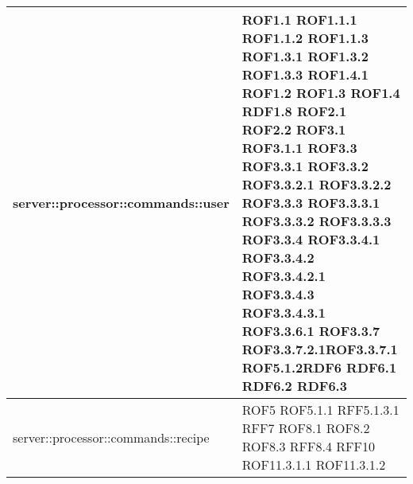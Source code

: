 \begin{center}
\begin{longtable}{| p{9cm} | p{4cm} |}
server::processor::commands::user  &  ROF1.1 \newline ROF1.1.1 \newline ROF1.1.2 \newline ROF1.1.3 \newline ROF1.3.1 \newline ROF1.3.2 \newline ROF1.3.3 \newline ROF1.4.1 \newline ROF1.2 \newline ROF1.3 \newline ROF1.4 \newline RDF1.8 \newline ROF2.1 \newline ROF2.2 \newline ROF3.1 \newline ROF3.1.1  \newline ROF3.3 \newline ROF3.3.1 \newline ROF3.3.2 \newline ROF3.3.2.1 \newline ROF3.3.2.2 \newline ROF3.3.3 \newline ROF3.3.3.1 \newline ROF3.3.3.2 \newline ROF3.3.3.3 \newline ROF3.3.4 \newline ROF3.3.4.1 \newline ROF3.3.4.2 \newline ROF3.3.4.2.1 \newline ROF3.3.4.3 \newline ROF3.3.4.3.1 \newline ROF3.3.6.1 \newline ROF3.3.7 \newline ROF3.3.7.2.1\newline ROF3.3.7.1 \newline ROF5.1.2\newline RDF6 \newline RDF6.1 \newline RDF6.2 \newline RDF6.3 \newline \\
\hline
server::processor::commands::recipe  & ROF5 \newline ROF5.1.1 \newline RFF5.1.3.1 \newline RFF7 \newline ROF8.1 \newline ROF8.2 \newline ROF8.3 \newline RFF8.4 \newline RFF10 \newline ROF11.3.1.1 \newline ROF11.3.1.2 \newline \\

\end{longtable}
\end{center}
